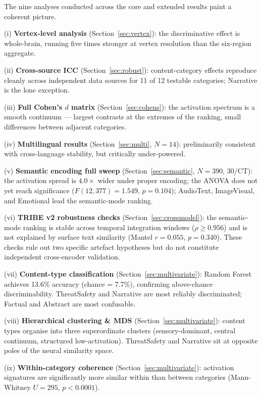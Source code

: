 \documentclass[11pt,letterpaper]{article}
\numberwithin{equation}{section}
\begin{document}
The nine analyses conducted across the core and extended results paint a coherent picture.

(i) \textbf{Vertex-level analysis} (Section~\ref{sec:vertex}): the discriminative effect is whole-brain, running five times stronger at vertex resolution than the six-region aggregate.

(ii) \textbf{Cross-source ICC} (Section~\ref{sec:robust}): content-category effects reproduce cleanly across independent data sources for 11 of 12 testable categories; Narrative is the lone exception.

(iii) \textbf{Full Cohen's $d$ matrix} (Section~\ref{sec:cohens}): the activation spectrum is a smooth continuum --- largest contrasts at the extremes of the ranking, small differences between adjacent categories.

(iv) \textbf{Multilingual results} (Section~\ref{sec:multi}, $N=14$): preliminarily consistent with cross-language stability, but critically under-powered.

(v) \textbf{Semantic encoding full sweep} (Section~\ref{sec:semantic}, $N=390$, 30/CT): the activation spread is $4.0\times$ wider under proper encoding; the ANOVA does not yet reach significance ($F(12,377)=1.549$, $p=0.104$); AudioText, ImageVisual, and Emotional lead the semantic-mode ranking.

(vi) \textbf{TRIBE v2 robustness checks} (Section~\ref{sec:crossmodel}): the semantic-mode ranking is stable across temporal integration windows ($\rho \geq 0.956$) and is not explained by surface text similarity (Mantel $r = 0.055$, $p = 0.340$). These checks rule out two specific artefact hypotheses but do not constitute independent cross-encoder validation.

(vii) \textbf{Content-type classification} (Section~\ref{sec:multivariate}): Random Forest achieves 13.6\% accuracy (chance = 7.7\%), confirming above-chance discriminability. ThreatSafety and Narrative are most reliably discriminated; Factual and Abstract are most confusable.

(viii) \textbf{Hierarchical clustering \& MDS} (Section~\ref{sec:multivariate}): content types organise into three superordinate clusters (sensory-dominant, central continuum, structured low-activation). ThreatSafety and Narrative sit at opposite poles of the neural similarity space.

(ix) \textbf{Within-category coherence} (Section~\ref{sec:multivariate}): activation signatures are significantly more similar within than between categories (Mann-Whitney $U = 295$, $p < 0.0001$).
\end{document}
